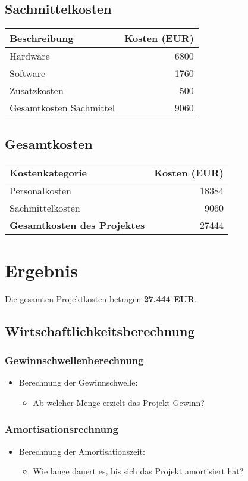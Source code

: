 \subsection*{Sachmittelkosten}
\begin{tabular}{lr}
  \toprule
  \textbf{Beschreibung} & \textbf{Kosten (EUR)} \\
  \midrule
  Hardware & 6800 \\
  Software & 1760 \\
  Zusatzkosten & 500 \\
  \midrule
  Gesamtkosten Sachmittel & 9060 \\
  \bottomrule
\end{tabular}

\subsection*{Gesamtkosten}
\begin{tabular}{lr}
  \toprule
  \textbf{Kostenkategorie} & \textbf{Kosten (EUR)} \\
  \midrule
  Personalkosten & 18384 \\
  Sachmittelkosten & 9060 \\
  \midrule
  \textbf{Gesamtkosten des Projektes} & 27444 \\
  \bottomrule
\end{tabular}

\section*{Ergebnis}
Die gesamten Projektkosten betragen \textbf{27.444 EUR}.


\subsection{Wirtschaftlichkeitsberechnung}\label{wirtschaftlichkeitsberechnung}

\subsubsection{Gewinnschwellenberechnung}\label{gewinnschwellenberechnung}

\begin{itemize}
\item
  Berechnung der Gewinnschwelle:

  \begin{itemize}
  
  \item
    Ab welcher Menge erzielt das Projekt Gewinn?
  \end{itemize}
\end{itemize}

\subsubsection{Amortisationsrechnung}\label{amortisationsrechnung}

\begin{itemize}
\item
  Berechnung der Amortisationszeit:

  \begin{itemize}
  
  \item
    Wie lange dauert es, bis sich das Projekt amortisiert hat?
  \end{itemize}
\end{itemize}